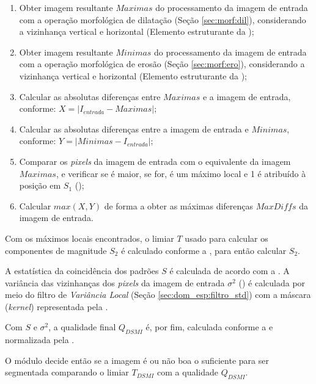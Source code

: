 \begin{enumerate}
    \item Obter imagem resultante $Maximas$ do processamento da imagem de entrada com a operação morfológica de dilatação (Seção \ref{sec:morf:dil}), considerando a vizinhança vertical e horizontal (Elemento estruturante da );
    \item Obter imagem resultante $Minimas$ do processamento da imagem de entrada com a operação morfológica de erosão (Seção \ref{sec:morf:ero}), considerando a vizinhança vertical e horizontal (Elemento estruturante da );
    \item Calcular as absolutas diferenças entre $Maximas$ e a imagem de entrada, conforme: $X = |I_{entrada} - Maximas|$;
    \item Calcular as absolutas diferenças entre a imagem de entrada e $Minimas$, conforme: $Y = |Minimas - I_{entrada}|$;
    \item Comparar os \textit{pixels} da imagem de entrada com o equivalente da imagem $Maximas$, e verificar se é maior, se for, é um máximo local e 1 é atribuído à posição em $S_{1}$ ();
    \item Calcular $max(X, Y)$ de forma a obter as máximas diferenças $MaxDiffs$ da imagem de entrada.
\end{enumerate}

\par Com os máximos locais encontrados, o limiar $T$ usado para calcular os componentes de magnitude $S_{2}$ é calculado conforme a , para então calcular $S_{2}$. 

\par A estatística da coincidência dos padrões $S$ é calculada de acordo com a . A variância das vizinhanças dos \textit{pixels} da imagem de entrada $\sigma^2$ () é calculada por meio do filtro de \textit{Variância Local} (Seção \ref{sec:dom_esp:filtro_std}) com a máscara (\textit{kernel}) representada pela .

\par Com $S$ e $\sigma^2$, a qualidade final $Q_{DSMI}$ é, por fim, calculada conforme a  e normalizada pela .

\par O módulo decide então se a imagem é ou não boa o suficiente para ser segmentada comparando o limiar $T_{DSMI}$ com a qualidade $Q_{DSMI}$.

